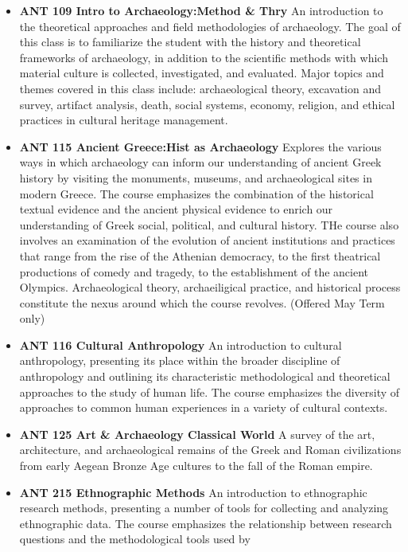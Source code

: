 \documentclass[
  letterpaper,
]{scrbook}
\providecommand{\tightlist}{%
  \setlength{\itemsep}{0pt}\setlength{\parskip}{0pt}}
\begin{document}
\begin{itemize}
\tightlist
\item
  \textbf{ANT 109 Intro to Archaeology:Method \& Thry} An introduction
  to the theoretical approaches and field methodologies of archaeology.
  The goal of this class is to familiarize the student with the history
  and theoretical frameworks of archaeology, in addition to the
  scientific methods with which material culture is collected,
  investigated, and evaluated. Major topics and themes covered in this
  class include: archaeological theory, excavation and survey, artifact
  analysis, death, social systems, economy, religion, and ethical
  practices in cultural heritage management.
\item
  \textbf{ANT 115 Ancient Greece:Hist as Archaeology} Explores the
  various ways in which archaeology can inform our understanding of
  ancient Greek history by visiting the monuments, museums, and
  archaeological sites in modern Greece. The course emphasizes the
  combination of the historical textual evidence and the ancient
  physical evidence to enrich our understanding of Greek social,
  political, and cultural history. THe course also involves an
  examination of the evolution of ancient institutions and practices
  that range from the rise of the Athenian democracy, to the first
  theatrical productions of comedy and tragedy, to the establishment of
  the ancient Olympics. Archaeological theory, archaeiligical practice,
  and historical process constitute the nexus around which the course
  revolves. (Offered May Term only)
\item
  \textbf{ANT 116 Cultural Anthropology} An introduction to cultural
  anthropology, presenting its place within the broader discipline of
  anthropology and outlining its characteristic methodological and
  theoretical approaches to the study of human life. The course
  emphasizes the diversity of approaches to common human experiences in
  a variety of cultural contexts.
\item
  \textbf{ANT 125 Art \& Archaeology Classical World} A survey of the
  art, architecture, and archaeological remains of the Greek and Roman
  civilizations from early Aegean Bronze Age cultures to the fall of the
  Roman empire.
\item
  \textbf{ANT 215 Ethnographic Methods} An introduction to ethnographic
  research methods, presenting a number of tools for collecting and
  analyzing ethnographic data. The course emphasizes the relationship
  between research questions and the methodological tools used by

\end{itemize}
\end{document}
